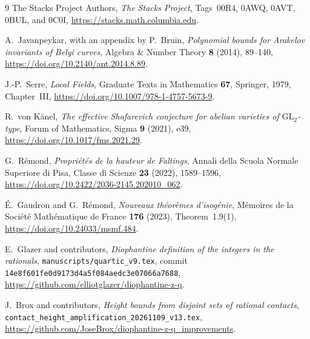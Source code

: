\documentclass[11pt,a4paper]{article}
\theoremstyle{definition}
\begin{document}
\begin{thebibliography}{9}
The Stacks Project Authors, \emph{The Stacks Project},
Tags~00R4, 0AWQ, 0AVT, 0BUL, and 0C0I,
\url{https://stacks.math.columbia.edu}.

A.~Javanpeykar, with an appendix by P.~Bruin,
\emph{Polynomial bounds for Arakelov invariants of Belyi curves},
Algebra \& Number Theory \textbf{8} (2014), 89--140,
\url{https://doi.org/10.2140/ant.2014.8.89}.

J.-P.~Serre, \emph{Local Fields}, Graduate Texts in Mathematics
\textbf{67}, Springer, 1979, Chapter~III,
\url{https://doi.org/10.1007/978-1-4757-5673-9}.

R.~von K\"anel, \emph{The effective Shafarevich conjecture for abelian
varieties of $\mathrm{GL}_2$-type}, Forum of Mathematics, Sigma
\textbf{9} (2021), e39,
\url{https://doi.org/10.1017/fms.2021.29}.

G.~R\'emond, \emph{Propri\'et\'es de la hauteur de Faltings},
Annali della Scuola Normale Superiore di Pisa, Classe di Scienze
\textbf{23} (2022), 1589--1596,
\url{https://doi.org/10.2422/2036-2145.202010_062}.

\'E.~Gaudron and G.~R\'emond,
\emph{Nouveaux th\'eor\`emes d'isog\'enie},
M\'emoires de la Soci\'et\'e Math\'ematique de France
\textbf{176} (2023), Theorem~1.9(1),
\url{https://doi.org/10.24033/msmf.484}.

E.~Glazer and contributors,
\emph{Diophantine definition of the integers in the rationals},
\texttt{manuscripts/quartic\_v9.tex}, commit
\texttt{14e8f601fe0d9173d4a5f084aedc3e07066a7688},
\url{https://github.com/elliotglazer/diophantine-z-q}.

J.~Brox and contributors,
\emph{Height bounds from disjoint sets of rational contacts},
\texttt{contact\_height\_amplification\_20261109\_v13.tex},
\url{https://github.com/JoseBrox/diophantine-z-q_improvements}.
\end{thebibliography}
\end{document}

